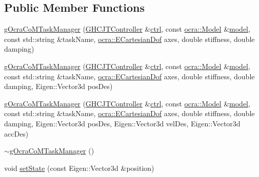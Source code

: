 \subsection*{Public Member Functions}
\begin{DoxyCompactItemize}
\item 
\hyperlink{classgocra_1_1gOcraCoMTaskManager_a7e9edb0004e6c63e689fcc3f260bdf96}{g\+Ocra\+Co\+M\+Task\+Manager} (\hyperlink{classgocra_1_1GHCJTController}{G\+H\+C\+J\+T\+Controller} \&\hyperlink{classgocra_1_1gOcraTaskManagerBase_a52d76d9b54d92f3d31faeaafda99e4c7}{ctrl}, const \hyperlink{classocra_1_1Model}{ocra\+::\+Model} \&\hyperlink{classgocra_1_1gOcraTaskManagerBase_adc439e7170f7120611fc6d009d06404e}{model}, const std\+::string \&task\+Name, \hyperlink{namespaceocra_a436781c7059a0f76027df1c652126260}{ocra\+::\+E\+Cartesian\+Dof} axes, double stiffness, double damping)
\item 
\hyperlink{classgocra_1_1gOcraCoMTaskManager_a13a282eaeb3edb57adee2b5973f9ad71}{g\+Ocra\+Co\+M\+Task\+Manager} (\hyperlink{classgocra_1_1GHCJTController}{G\+H\+C\+J\+T\+Controller} \&\hyperlink{classgocra_1_1gOcraTaskManagerBase_a52d76d9b54d92f3d31faeaafda99e4c7}{ctrl}, const \hyperlink{classocra_1_1Model}{ocra\+::\+Model} \&\hyperlink{classgocra_1_1gOcraTaskManagerBase_adc439e7170f7120611fc6d009d06404e}{model}, const std\+::string \&task\+Name, \hyperlink{namespaceocra_a436781c7059a0f76027df1c652126260}{ocra\+::\+E\+Cartesian\+Dof} axes, double stiffness, double damping, Eigen\+::\+Vector3d pos\+Des)
\item 
\hyperlink{classgocra_1_1gOcraCoMTaskManager_a4088d516f4de3db74ccef3bb4560f3fa}{g\+Ocra\+Co\+M\+Task\+Manager} (\hyperlink{classgocra_1_1GHCJTController}{G\+H\+C\+J\+T\+Controller} \&\hyperlink{classgocra_1_1gOcraTaskManagerBase_a52d76d9b54d92f3d31faeaafda99e4c7}{ctrl}, const \hyperlink{classocra_1_1Model}{ocra\+::\+Model} \&\hyperlink{classgocra_1_1gOcraTaskManagerBase_adc439e7170f7120611fc6d009d06404e}{model}, const std\+::string \&task\+Name, \hyperlink{namespaceocra_a436781c7059a0f76027df1c652126260}{ocra\+::\+E\+Cartesian\+Dof} axes, double stiffness, double damping, Eigen\+::\+Vector3d pos\+Des, Eigen\+::\+Vector3d vel\+Des, Eigen\+::\+Vector3d acc\+Des)
\item 
\hyperlink{classgocra_1_1gOcraCoMTaskManager_ae1de7bee1de0ccd0b904baccdd4ca9c0}{$\sim$g\+Ocra\+Co\+M\+Task\+Manager} ()
\item 
void \hyperlink{classgocra_1_1gOcraCoMTaskManager_a413a7722455a89c99c4efd11e8226104}{set\+State} (const Eigen\+::\+Vector3d \&position)

\end{DoxyCompactItemize}
